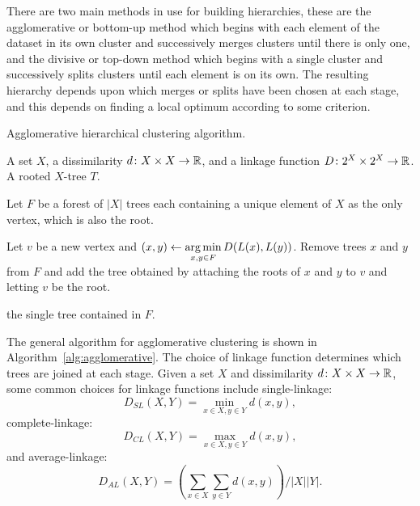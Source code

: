 There are two main methods in use for building hierarchies, these are the
agglomerative or bottom-up method which begins with each element of the
dataset in its own cluster and successively merges clusters until there is
only one, and the divisive or top-down method which begins with a single
cluster and successively splits clusters until each element is on its own.
The resulting hierarchy depends upon which merges or splits have been chosen
at each stage, and this depends on finding a local optimum according to some
criterion.

\begin{algorithm}[h]
  \caption{Agglomerative hierarchical clustering algorithm.}
  \label{alg:agglomerative}

  \begin{algorithmic}
    \Require A set $X$, a dissimilarity $d \colon X \times X \to {\mathbb R}$, and a
    linkage function $D \colon 2^X \times 2^X \to {\mathbb R}$.
    \Ensure  A rooted $X$-tree $T$.

    \State Let $F$ be a forest of $|X|$ trees each containing a unique element
    of $X$ as the only vertex, which is also the root.


       \State Let $v$ be a new vertex and $\displaystyle (x,y) \gets \operatorname*{arg\,min}_{x,y
         \in F} D(L(x),L(y))$.
       \State Remove trees $x$ and $y$ from $F$ and add the tree obtained by
         attaching the roots of $x$ and $y$ to $v$ and letting $v$ be the root.
    
    \EndWhile

    \State \Return the single tree contained in $F$.
    
  \end{algorithmic}
\end{algorithm}

The general algorithm for agglomerative clustering is shown in
Algorithm~\ref{alg:agglomerative}.  The choice of linkage function determines
which trees are joined at each stage.  Given a set $X$ and dissimilarity $d
\colon X \times X \to {\mathbb R}$, some common choices for linkage functions include
single-linkage:
\begin{equation}
  \label{eq:slink}
  D_{SL}(X,Y) = \min_{x \in X, y \in Y} d(x,y),
\end{equation}
complete-linkage:
\begin{equation}
  \label{eq:clink}
  D_{CL}(X,Y) = \max_{x \in X, y \in Y} d(x,y),
\end{equation}
and average-linkage:
\begin{equation}
  \label{eq:alink}
  D_{AL}(X,Y) = \left( \sum_{x \in X} \sum_{y \in Y} d(x,y) \right) / |X| |Y|.
\end{equation}

